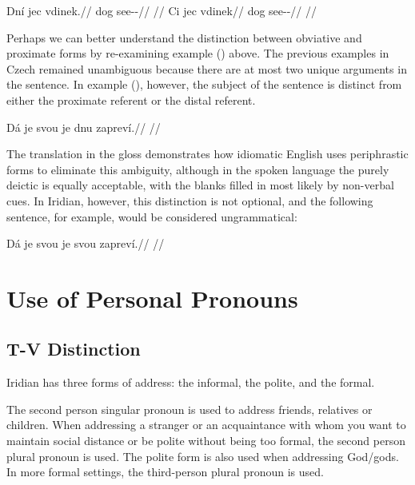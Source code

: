 \pex
\a
\begingl
\gla Dní jec vdinek.//
\glb {} dog see-\Pv{}-\Pf{}//
\glft {}//
\endgl
\a \begingl
\gla Ci jec vdinek//
\glb {} dog see-\Pv{}-\Pf{}//
\glft {}//
\endgl
\xe

Perhaps we can better understand the distinction between obviative and proximate forms by re-examining example () above. The previous examples in Czech remained unambiguous because there are at most two unique arguments in the sentence. In example (), however, the subject of the sentence is distinct from either the proximate referent or the distal referent.

\ex[exno={\getfullref{obv.obv1}}]
\begingl
\gla Dá je svou je dnu zapreví.//
\glft {}//
\endgl
\xe

The translation in the gloss demonstrates how idiomatic English uses periphrastic forms to eliminate this ambiguity, although in the spoken language the purely deictic  is equally acceptable, with the blanks filled in most likely by non-verbal cues. In Iridian, however, this distinction is not optional, and the following sentence, for example, would be considered ungrammatical:

\ex
\begingl
\gla *Dá je svou je svou zapreví.//
\glft {}//
\endgl
\xe

\section{Use of Personal Pronouns}

\subsection{T-V Distinction}

Iridian has three forms of address: the informal, the polite, and the formal.

The second person singular pronoun  is used to address friends, relatives or children. When addressing a stranger or an acquaintance with whom you want to maintain social distance or be polite without being too formal, the second person plural pronoun  is used. The polite form is also used when addressing God/gods. In more formal settings, the third-person plural pronoun  is used.


